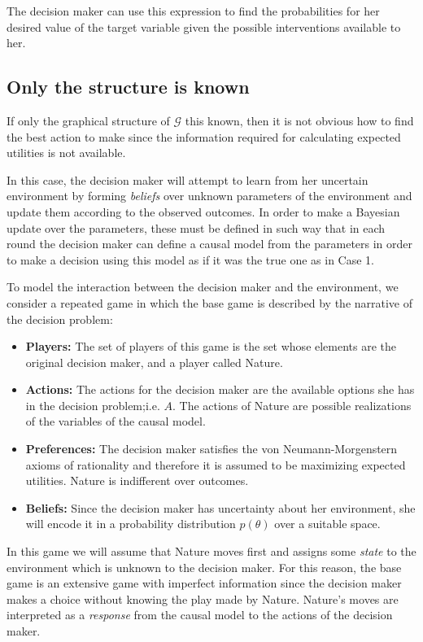 \documentclass{article}
\begin{document}
The decision maker can use this expression to find the probabilities for her desired value of the target variable given the possible interventions available to her.

\subsection{Only the structure is known}
If only the graphical structure of $\mathcal{G}$ this known, then it is not obvious how to find the best action to make since the information required for calculating expected utilities is not available.

In this case, the decision maker will attempt to learn from her uncertain environment by forming \textit{beliefs} over unknown parameters of the environment and update them according to the observed outcomes. In order to make a Bayesian update over the parameters, these must be defined in such way that in each round the decision maker can define a causal model from the parameters in order to make a decision using this model as if it was the true one as in Case 1.

To model the interaction between the decision maker and the environment, we consider a repeated game in which the base game is described by the narrative of the decision problem: 
\begin{itemize}
\item \textbf{Players:} The set of players of this game is the set whose elements are the original decision maker, and a player called Nature.
\item \textbf{Actions:} The actions for the decision maker are the available options she has in the decision problem;i.e. $A$. The actions of Nature are possible realizations of the variables of the causal model. 
\item \textbf{Preferences:} The decision maker satisfies the von Neumann-Morgenstern axioms of rationality and therefore it is assumed to be maximizing expected utilities. Nature is indifferent over outcomes.
\item \textbf{Beliefs:} Since the decision maker has uncertainty about her environment, she will encode it in a probability distribution $p(\theta)$ over a suitable space.
\end{itemize}

In this game we will assume that Nature moves first and assigns some \textit{state} to the environment which is unknown to the decision maker. For this reason, the base game is an extensive game with imperfect information since the decision maker makes a choice without knowing the play made by Nature. Nature's moves are interpreted as a \textit{response} from the causal model to the actions of the decision maker.
\end{document}

